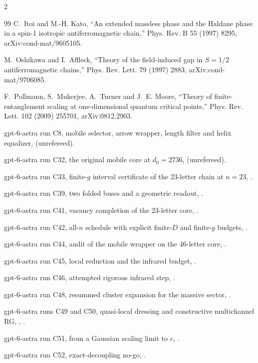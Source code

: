\documentclass[11pt]{article}
\theoremstyle{definition}
\begin{document}
\begin{multicols}{2}
\begin{thebibliography}{99}
 C.~Itoi and M.-H. Kato, ``An extended massless phase and the Haldane phase in a spin-1 isotropic antiferromagnetic chain,'' Phys. Rev. B 55 (1997) 8295, arXiv:cond-mat/9605105.

 M.~Oshikawa and I.~Affleck, ``Theory of the field-induced gap in $S=1/2$ antiferromagnetic chains,'' Phys. Rev. Lett. 79 (1997) 2883, arXiv:cond-mat/9706085.

 F.~Pollmann, S.~Mukerjee, A.~Turner and J.~E. Moore, ``Theory of finite-entanglement scaling at one-dimensional quantum critical points,'' Phys. Rev. Lett. 102 (2009) 255701, arXiv:0812.2903.

 gpt-6-astra run C8, mobile selector, arrow wrapper, length filter and helix equalizer,  (unrefereed).

 gpt-6-astra run C32, the original mobile core at $d_0=2736$,  (unrefereed).

 gpt-6-astra run C33, finite-$g$ interval certificate of the 23-letter chain at $n=23$, .

 gpt-6-astra run C39, two folded buses and a geometric readout, .

 gpt-6-astra run C41, vacancy completion of the 23-letter core, .

 gpt-6-astra run C42, all-$n$ schedule with explicit finite-$D$ and finite-$g$ budgets, .

 gpt-6-astra run C44, audit of the mobile wrapper on the 46-letter core, .

 gpt-6-astra run C45, local reduction and the infrared budget, .

 gpt-6-astra run C46, attempted rigorous infrared step, .

 gpt-6-astra run C48, resummed cluster expansion for the massive sector, .

 gpt-6-astra runs C49 and C50, quasi-local dressing and constructive multichannel RG, , .

 gpt-6-astra run C51, from a Gaussian scaling limit to $c$, .

 gpt-6-astra run C52, exact-decoupling no-go, .


\end{thebibliography}
\end{multicols}
\end{document}
